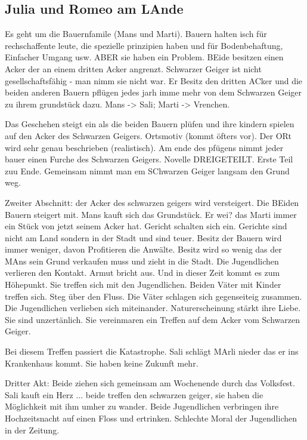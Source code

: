 \documentclass[12pt,a4paper]{article}
\begin{document}
\subsection{Julia und Romeo am LAnde}

Es geht um die Bauernfamile (Mans und Marti). Bauern halten isch für rechschaffente leute, die spezielle prinzipien haben und für Bodenbehaftung, Einfacher Umgang usw. ABER sie haben ein Problem. BEide besitzen einen Acker der an einem dritten Acker angrenzt. Schwarzer Geiger ist nicht gesellschaftsfähig - man nimm sie nicht war. Er Besitz den dritten ACker und die beiden anderen Bauern pflügen  jedes jarh imme mehr von dem Schwarzen Geiger zu ihrem grundstück dazu. Mans -> Sali; Marti -> Vrenchen.

Das Geschehen steigt ein als die beiden Bauern plüfen und ihre kindern spielen auf den Acker des Schwarzen Geigers. Ortsmotiv (kommt öfters vor). Der ORt wird sehr genau beschrieben (realistisch). Am ende des pfügens nimmt jeder bauer einen Furche des Schwarzen Geigers. 
Novelle DREIGETEILT. Erste Teil zuu Ende. Gemeinsam nimmt man em SChwarzen Geiger langsam den Grund weg.

Zweiter Abschnitt: der Acker des schwarzen geigers wird versteigert. Die BEiden Bauern steigert mit. Mans kauft sich das Grundstück. Er wei? das Marti immer ein Stück von jetzt seinem Acker hat. Gericht schalten sich ein. Gerichte sind nicht am Land sondern in der Stadt und sind teuer. Besitz der Bauern wird immer weniger, davon Profitieren die Anwälte. Besitz wird so wenig das der MAns sein Grund verkaufen muss und zieht in die Stadt. Die Jugendlichen verlieren den Kontakt. Armut bricht aus.
Und in dieser Zeit kommt es zum Höhepunkt. Sie treffen sich mit den Jugendlichen. Beiden Väter mit Kinder treffen sich. Steg über den Fluss. Die Väter schlagen sich gegenseiteig zusammen. Die Jugendlichen verlieben sich miteinander. Naturerscheinung stärkt ihre Liebe. Sie sind unzertänlich. Sie vereinmaren ein Treffen auf dem Acker vom Schwarzen Geiger. 

Bei diesem Treffen passiert die Katastrophe. Sali schlägt MArli nieder das er ins Krankenhaus kommt. Sie haben keine Zukunft mehr.

Dritter Akt: Beide ziehen sich gemeinsam am Wochenende durch das Volksfest. Sali kauft ein Herz ... beide treffen den schwarzen geiger, sie haben die Möglichkeit mit ihm umher zu wander. Beide Jugendlichen verbringen ihre Hochzeitsnacht auf einen Floss und ertrinken. Schlechte Moral der Jugendlichen in der Zeitung.
\end{document}
